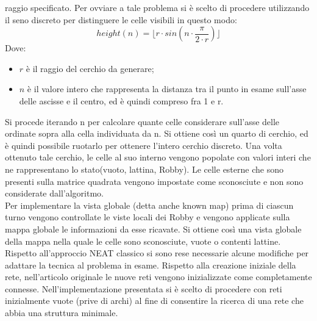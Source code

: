 raggio specificato. Per ovviare a tale problema si è scelto di procedere 
utilizzando il seno discreto per distinguere le celle visibili in questo modo:
\[height(n)=\lfloor r \cdot sin(n\cdot\frac{\pi}{2\cdot r})\rfloor \]
Dove:
\begin{itemize}
  \item $r$ è il raggio del cerchio da generare; 
  \item $n$ è il valore intero che rappresenta la distanza tra il punto in 
  esame sull'asse delle ascisse e il centro, ed è quindi compreso fra 1 e r.
\end{itemize}
Si procede iterando n per calcolare quante celle considerare sull'asse delle 
ordinate sopra alla cella individuata da n. Si ottiene così un quarto di 
cerchio, ed è quindi possibile ruotarlo per ottenere l'intero cerchio discreto.
Una volta ottenuto tale cerchio, le celle al suo interno vengono popolate con 
valori interi che ne rappresentano lo stato(vuoto, lattina, Robby). Le celle 
esterne che sono presenti sulla matrice quadrata vengono impostate come 
sconosciute e non sono considerate dall'algoritmo.
\\
Per implementare la vista globale (detta anche known map) prima di ciascun 
turno vengono controllate le viste locali dei Robby e vengono applicate sulla 
mappa globale le informazioni da esse ricavate. Si ottiene così una vista
globale della mappa nella quale le celle sono sconosciute, vuote o contenti
lattine.
\\

Rispetto all'approccio NEAT classico si sono rese necessarie alcune modifiche
per adattare la tecnica al problema in esame. Rispetto alla creazione iniziale
della rete, nell'articolo originale\cite{stanley2002evolving} le nuove reti
vengono inizializzate come completamente connesse. Nell'implementazione
presentata si è scelto di procedere con reti inizialmente vuote (prive di
archi) al fine di consentire la ricerca di una rete che abbia una struttura
minimale.\\

